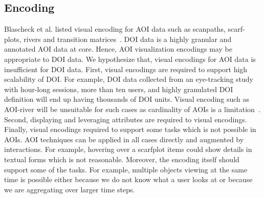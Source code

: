 \subsection{Encoding}
Blascheck et al. listed visual encoding for AOI data such as scanpaths, scarf-plots, rivers and transition matrices~\cite{blascheck2014state}. DOI data is a highly granular and annotated AOI data at core. Hence, AOI visualization encodings may be appropriate to DOI data. We hypothesize that, visual encodings for AOI data is insufficient for DOI data. First, visual encodings are required to support high scalability of DOI. For example, DOI data collected from an eye-tracking study with hour-long sessions, more than ten users, and highly granulated DOI definition will end up having thousands of DOI units. Visual encoding such as AOI-river will be unsuitable for such cases as cardinality of AOIs is a limitation~\cite{burch2013aoi}. Second, displaying and leveraging attributes are required to visual encodings. Finally, visual encodings required to support some tasks which is not possible in AOIs. AOI techniques can be applied in all cases directly and augmented by interactions. For example, hovering over a scarfplot items could show details in textual forms which is not reasonable. Moreover, the encoding itself should support some of the tasks. For example, multiple objects viewing at the same time is possible either because we do not know what a user looks at or because we are aggregating over larger time steps.

